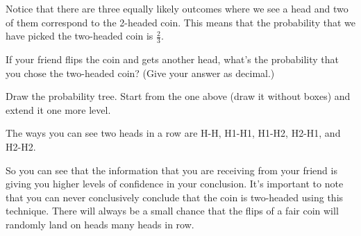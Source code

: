 \documentclass{ximera}
\begin{document}
\begin{image}
\end{image}

Notice that there are three equally likely outcomes where we see a head and two of them correspond to the 2-headed coin. This means that the probability that we have picked the two-headed coin is $\frac{2}{3}$.

\begin{question}
If your friend flips the coin and gets another head, what's the probability that you chose the two-headed coin? (Give your answer as decimal.)

    \begin{hint}
      Draw the probability tree. Start from the one above (draw it without boxes) and extend it one more level.
    \end{hint}
    \begin{hint}
      The ways you can see two heads in a row are H-H, H1-H1, H1-H2, H2-H1, and H2-H2.
    \end{hint}

\end{question}

So you can see that the information that you are receiving from your friend is giving you higher levels of confidence in your conclusion. It's important to note that you can never conclusively conclude that the coin is two-headed using this technique. There will always be a small chance that the flips of a fair coin will randomly land on heads many heads in row.
\end{document}
